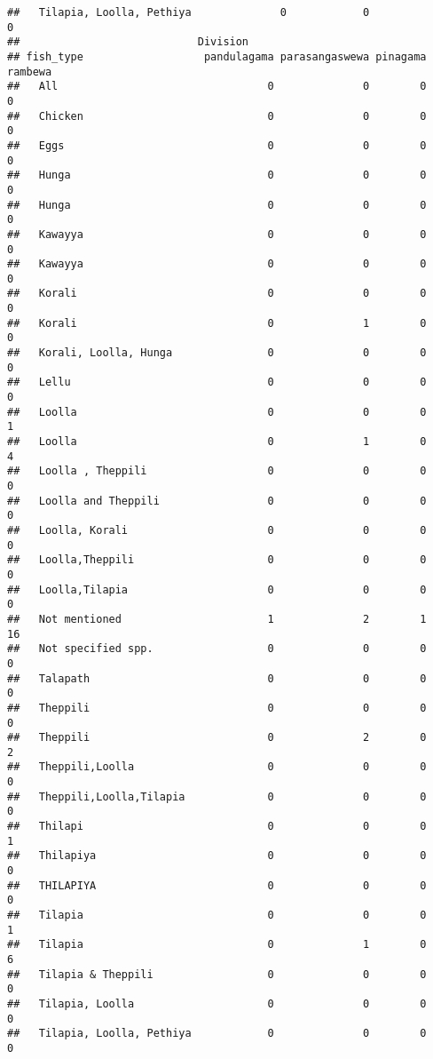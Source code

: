 \documentclass[
]{article}
\begin{document}
\begin{verbatim}
##   Tilapia, Loolla, Pethiya              0            0                0
##                            Division
## fish_type                   pandulagama parasangaswewa pinagama rambewa
##   All                                 0              0        0       0
##   Chicken                             0              0        0       0
##   Eggs                                0              0        0       0
##   Hunga                               0              0        0       0
##   Hunga                               0              0        0       0
##   Kawayya                             0              0        0       0
##   Kawayya                             0              0        0       0
##   Korali                              0              0        0       0
##   Korali                              0              1        0       0
##   Korali, Loolla, Hunga               0              0        0       0
##   Lellu                               0              0        0       0
##   Loolla                              0              0        0       1
##   Loolla                              0              1        0       4
##   Loolla , Theppili                   0              0        0       0
##   Loolla and Theppili                 0              0        0       0
##   Loolla, Korali                      0              0        0       0
##   Loolla,Theppili                     0              0        0       0
##   Loolla,Tilapia                      0              0        0       0
##   Not mentioned                       1              2        1      16
##   Not specified spp.                  0              0        0       0
##   Talapath                            0              0        0       0
##   Theppili                            0              0        0       0
##   Theppili                            0              2        0       2
##   Theppili,Loolla                     0              0        0       0
##   Theppili,Loolla,Tilapia             0              0        0       0
##   Thilapi                             0              0        0       1
##   Thilapiya                           0              0        0       0
##   THILAPIYA                           0              0        0       0
##   Tilapia                             0              0        0       1
##   Tilapia                             0              1        0       6
##   Tilapia & Theppili                  0              0        0       0
##   Tilapia, Loolla                     0              0        0       0
##   Tilapia, Loolla, Pethiya            0              0        0       0

\end{verbatim}
\end{document}
